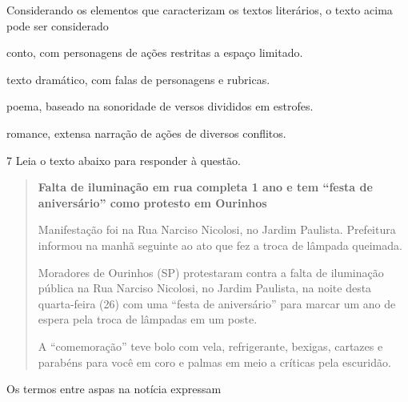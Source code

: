 
Considerando os elementos que caracterizam os textos literários, o texto
acima pode ser considerado

\begin{escolha}

    \item conto, com personagens de ações restritas a espaço limitado.
    
    \item texto dramático, com falas de personagens e rubricas.  
    
    \item poema, baseado na sonoridade de versos divididos em estrofes.  
    
    \item romance, extensa narração de ações de diversos conflitos. 

\end{escolha}

\num{7} Leia o texto abaixo para responder à questão. 

\begin{quote}

\textbf{Falta de iluminação em rua completa 1 ano e tem ``festa de
aniversário'' como protesto em Ourinhos}

Manifestação foi na Rua Narciso Nicolosi, no Jardim Paulista. Prefeitura
informou na manhã seguinte ao ato que fez a troca de lâmpada queimada.

Moradores de Ourinhos (SP) protestaram contra a falta de iluminação
pública na Rua Narciso Nicolosi, no Jardim Paulista, na noite desta
quarta-feira (26) com uma ``festa de aniversário'' para marcar um ano de
espera pela troca de lâmpadas em um poste.

A ``comemoração'' teve bolo com vela, refrigerante, bexigas, cartazes e
parabéns para você em coro e palmas em meio a críticas pela escuridão.

\end{quote}


Os termos entre aspas na notícia expressam


